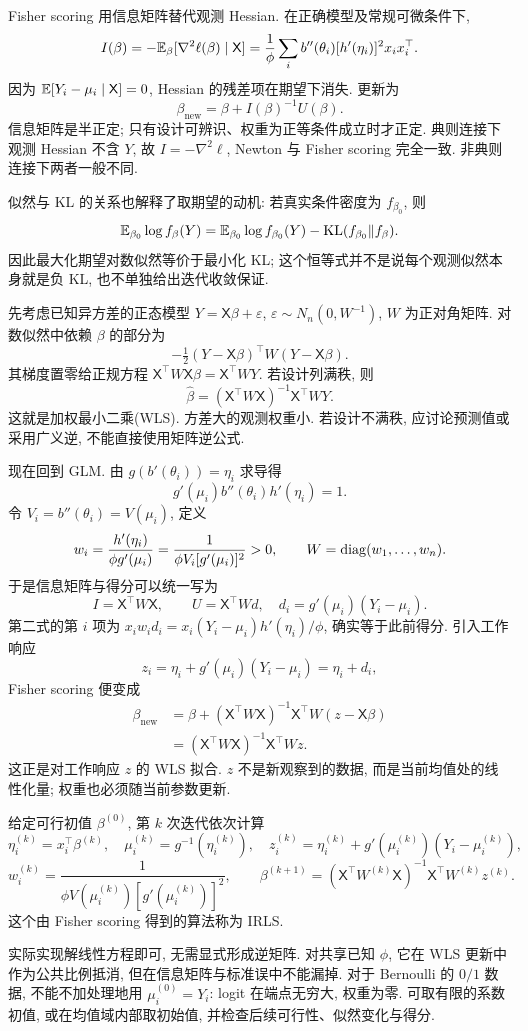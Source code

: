 Fisher scoring 用信息矩阵替代观测 Hessian. 在正确模型及常规可微条件下, 
\[
 I(\beta)=-\mathbb E_\beta[\nabla^2\ell(\beta)\mid\mathsf X]
 =\frac1\phi\sum_i b''(\theta_i)[h'(\eta_i)]^2x_ix_i^\top.
\]
因为 $\mathbb E[Y_i-\mu_i\mid\mathsf X]=0$, Hessian 的残差项在期望下消失. 更新为
\[
 \beta_{\mathrm{new}}=\beta+I(\beta)^{-1}U(\beta).
\]
信息矩阵是半正定; 只有设计可辨识、权重为正等条件成立时才正定. 典则连接下观测 Hessian 不含 $Y$, 故 $I=-\nabla^2\ell$, Newton 与 Fisher scoring 完全一致. 非典则连接下两者一般不同. 

似然与 KL 的关系也解释了取期望的动机: 若真实条件密度为 $f_{\beta_0}$, 则
\[
 \mathbb E_{\beta_0}\log f_\beta(Y)
 =\mathbb E_{\beta_0}\log f_{\beta_0}(Y)
   -\operatorname{KL}(f_{\beta_0}\Vert f_\beta).
\]
因此最大化期望对数似然等价于最小化 KL; 这个恒等式并不是说每个观测似然本身就是负 KL, 也不单独给出迭代收敛保证. 

先考虑已知异方差的正态模型 $Y=\mathsf X\beta+\varepsilon$, $\varepsilon\sim N_n(0,W^{-1})$, $W$ 为正对角矩阵. 对数似然中依赖 $\beta$ 的部分为
\[
 -\tfrac12(Y-\mathsf X\beta)^\top W(Y-\mathsf X\beta).
\]
其梯度置零给正规方程 $\mathsf X^\top W\mathsf X\beta=\mathsf X^\top WY$. 若设计列满秩, 则
\[
 \widehat\beta=(\mathsf X^\top W\mathsf X)^{-1}\mathsf X^\top WY.
\]
这就是加权最小二乘(WLS). 方差大的观测权重小. 若设计不满秩, 应讨论预测值或采用广义逆, 不能直接使用矩阵逆公式. 

现在回到 GLM. 由 $g(b'(\theta_i))=\eta_i$ 求导得
\[
 g'(\mu_i)b''(\theta_i)h'(\eta_i)=1.
\]
令 $V_i=b''(\theta_i)=V(\mu_i)$, 定义
\[
 w_i=\frac{h'(\eta_i)}{\phi g'(\mu_i)}
     =\frac1{\phi V_i[g'(\mu_i)]^2}>0,\qquad W=\operatorname{diag}(w_1,\ldots,w_n).
\]
于是信息矩阵与得分可以统一写为
\[
 I=\mathsf X^\top W\mathsf X,\qquad
 U=\mathsf X^\top Wd,\quad d_i=g'(\mu_i)(Y_i-\mu_i).
\]
第二式的第 $i$ 项为 $x_iw_id_i=x_i(Y_i-\mu_i)h'(\eta_i)/\phi$, 确实等于此前得分. 引入工作响应
\[
 z_i=\eta_i+g'(\mu_i)(Y_i-\mu_i)=\eta_i+d_i,
\]
Fisher scoring 便变成
\begin{align*}
 \beta_{\mathrm{new}}
 &=\beta+(\mathsf X^\top W\mathsf X)^{-1}\mathsf X^\top W(z-\mathsf X\beta)\\
 &=(\mathsf X^\top W\mathsf X)^{-1}\mathsf X^\top Wz.
\end{align*}
这正是对工作响应 $z$ 的 WLS 拟合. $z$ 不是新观察到的数据, 而是当前均值处的线性化量; 权重也必须随当前参数更新. 

\begin{definition}[迭代重加权最小二乘]
给定可行初值 $\beta^{(0)}$, 第 $k$ 次迭代依次计算
\[
 \eta_i^{(k)}=x_i^\top\beta^{(k)},\quad
 \mu_i^{(k)}=g^{-1}(\eta_i^{(k)}),\quad
 z_i^{(k)}=\eta_i^{(k)}+g'(\mu_i^{(k)})(Y_i-\mu_i^{(k)}),
\]
\[
 w_i^{(k)}=\frac1{\phi V(\mu_i^{(k)})[g'(\mu_i^{(k)})]^2},\qquad
 \beta^{(k+1)}=(\mathsf X^\top W^{(k)}\mathsf X)^{-1}
                         \mathsf X^\top W^{(k)}z^{(k)}.
\]
这个由 Fisher scoring 得到的算法称为 IRLS. 
\end{definition}
实际实现解线性方程即可, 无需显式形成逆矩阵. 对共享已知 $\phi$, 它在 WLS 更新中作为公共比例抵消, 但在信息矩阵与标准误中不能漏掉. 对于 Bernoulli 的 $0/1$ 数据, 不能不加处理地用 $\mu_i^{(0)}=Y_i$: logit 在端点无穷大, 权重为零. 可取有限的系数初值, 或在均值域内部取初始值, 并检查后续可行性、似然变化与得分. 

